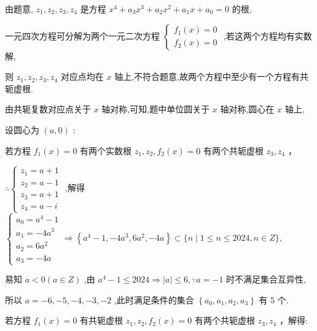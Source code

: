 \documentclass[10pt]{article}
\newcommand*\circled[1]{\tikz[baseline=(char.base)]{\node[shape=circle,draw,inner sep=1.5pt] (char) {\small #1};}}
\begin{document}
由题意, \({z}_{1},{z}_{2},{z}_{3},{z}_{4}\) 是方程 \({x}^{4} + {a}_{3}{x}^{3} + {a}_{2}{x}^{2} + {a}_{1}x + {a}_{0} = 0\) 的根,

一元四次方程可分解为两个一元二次方程 \(\left\{  \begin{array}{l} {f}_{1}\left( x\right)  = 0 \\  {f}_{2}\left( x\right)  = 0 \end{array}\right.\) ,若这两个方程均有实数解,

则 \({z}_{1},{z}_{2},{z}_{3},{z}_{4}\) 对应点均在 \(x\) 轴上,不符合题意,故两个方程中至少有一个方程有共轭虚根.

由共轭复数对应点关于 \(x\) 轴对称,可知,题中单位圆关于 \(x\) 轴对称,圆心在 \(x\) 轴上,

设圆心为 \(\left( {a,0}\right)\) :

 \circled{1}  若方程 \({f}_{1}\left( x\right)  = 0\) 有两个实数根 \({z}_{1},{z}_{2},{f}_{2}\left( x\right)  = 0\) 有两个共轭虚根 \({z}_{3},{z}_{4}\) ，

\(\therefore \left\{  \begin{array}{l} {z}_{1} = a + 1 \\  {z}_{2} = a - 1 \\  {z}_{3} = a + 1 \\  {z}_{4} = a - i \end{array}\right.\) ,解得 \(\left\{  {\begin{array}{l} {a}_{0} = {a}^{4} - 1 \\  {a}_{1} =  - 4{a}^{3} \\  {a}_{2} = 6{a}^{2} \\  {a}_{3} =  - {4a} \end{array} \Rightarrow  \left\{  {{a}^{4} - 1, - 4{a}^{3},6{a}^{2}, - {4a}}\right\}   \subset  \{ n \mid  1 \leq  n \leq  {2024},n \in  Z\} ,}\right.\)

易知 \(a < 0\left( {a \in  Z}\right)\) ,由 \({a}^{4} - 1 \leq  {2024} \Rightarrow  \left| a\right|  \leq  6,\because a =  - 1\) 时不满足集合互异性,

所以 \(a =  - 6, - 5, - 4, - 3, - 2\) ,此时满足条件的集合 \(\left\{  {{a}_{0},{a}_{1},{a}_{2},{a}_{3}}\right\}\) 有 5 个.

 \circled{2} 若方程 \({f}_{1}\left( x\right)  = 0\) 有共轭虚根 \({z}_{1},{z}_{2},{f}_{2}\left( x\right)  = 0\) 有两个共轭虚根 \({z}_{3},{z}_{4}\) ，解得:
\end{document}
